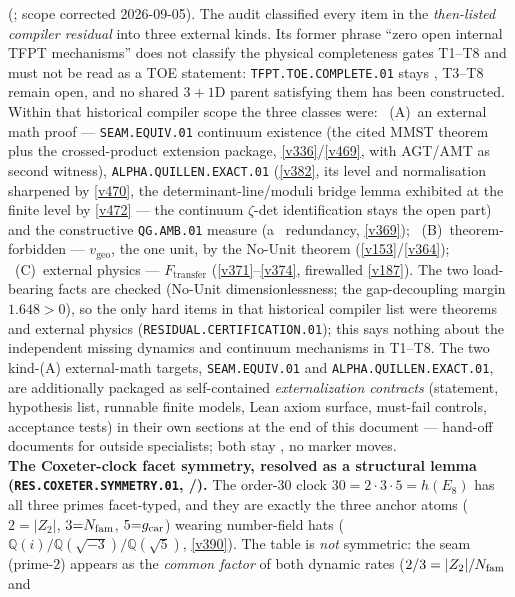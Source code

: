 \begin{keybox}
{(; scope corrected 2026-09-05).}  The audit
classified every item in the \emph{then-listed compiler residual} into three external kinds.  Its
former phrase ``zero open internal TFPT mechanisms'' does not classify the physical completeness
gates T1--T8 and must not be read as a TOE statement: \texttt{TFPT.TOE.COMPLETE.01} stays \mO,
T3--T8 remain open, and no shared $3{+}1$D parent satisfying them has been constructed.  Within
that historical compiler scope the three classes were: \mE\ (A)~an external math proof --- \texttt{SEAM.EQUIV.01} continuum existence (the
cited MMST theorem plus the crossed-product extension package, \vref{v336}/\vref{v469}, with AGT/AMT as second
witness), \texttt{ALPHA.QUILLEN.EXACT.01} (\vref{v382}, its level and normalisation sharpened by \vref{v470}, the
determinant-line/moduli bridge lemma exhibited at the finite level by \vref{v472} --- the continuum
$\zeta$-det identification stays the open part) and
the constructive \texttt{QG.AMB.01} measure (a \mC\ redundancy, \vref{v369}); \mE\ (B)~theorem-forbidden --- $v_{\mathrm{geo}}$, the
one unit, by the No-Unit theorem (\vref{v153}/\vref{v364}); \mE\ (C)~external physics --- $F_{\mathrm{transfer}}$
(\vref{v371}--\vref{v374}, firewalled \vref{v187}). The two load-bearing facts are checked (No-Unit
dimensionlessness; the gap-decoupling margin $1.648>0$), so the only hard items in that
historical compiler list were theorems and external physics
(\texttt{RESIDUAL.CERTIFICATION.01}); this says nothing about the independent missing dynamics
and continuum mechanisms in T1--T8. The two kind-(A) external-math
targets, \texttt{SEAM.EQUIV.01} and \texttt{ALPHA.QUILLEN.EXACT.01}, are additionally packaged as
self-contained \emph{externalization contracts} (statement, hypothesis list, runnable finite models,
Lean axiom surface, must-fail controls, acceptance tests) in their own sections at the end of this
document --- hand-off documents for outside specialists; both stay \mO, no marker moves.
\smallskip\\
\noindent\textbf{The Coxeter-clock facet symmetry, resolved as a structural lemma
(\texttt{RES.COXETER.SYMMETRY.01}, /).} The
order-$30$ clock $30=2{\cdot}3{\cdot}5=h(E_8)$ has all three primes facet-typed, and they are exactly the three
anchor atoms ($2{=}|Z_2|$, $3{=}N_{\mathrm{fam}}$, $5{=}g_{\mathrm{car}}$) wearing number-field hats
($\mathbb Q(i)/\mathbb Q(\sqrt{-3})/\mathbb Q(\sqrt5)$, \vref{v390}). The table is \emph{not} symmetric: the seam
(prime-$2$) appears as the \emph{common factor} of both dynamic rates ($2/3=|Z_2|/N_{\mathrm{fam}}$ and

\end{keybox}
